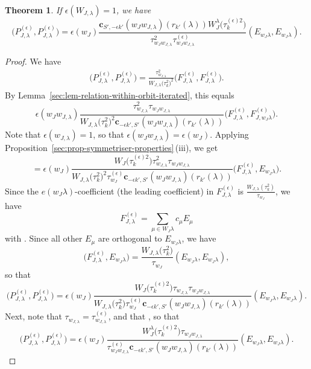 \documentclass[pdftex]{sigma}
\newtheorem{Theorem}{Theorem}[section]
\theoremstyle{definition}
\numberwithin{equation}{section}
\begin{document}
\begin{Theorem}
 If $\epsilon(W_{J,\lambda})=1$, we have
 \[
 \bigl(P^{(\epsilon)}_{J,\lambda}, P^{(\epsilon)}_{J,\lambda}\bigr)
 = \epsilon(w_J) \frac{\bm{c}_{S', -\epsilon k'}(w_Jw_{J,\lambda})(r_{k'}(\lambda)) W_J^\lambda\bigl(\tau^{(\epsilon)2}_k\bigr)}{\tau_{w_Jw_{J,\lambda}}^2\tau^{(\epsilon)}_{w_Jw_{J,\lambda}}}
 (E_{w_J\lambda}, E_{w_J\lambda}).
 \]
\end{Theorem}
\begin{proof}
 We have
 \begin{align*}
 \bigl(P^{(\epsilon)}_{J,\lambda}, P^{(\epsilon)}_{J,\lambda}\bigr)
 = \frac{\tau_{w_{J,\lambda}}^2}{W_{J,\lambda}\bigl(\tau_k^2\bigr)^2}
 \bigl(F^{(\epsilon)}_{J,\lambda}, F^{(\epsilon)}_{J,\lambda}\bigr).
 \end{align*}
 By Lemma~\ref{sec:lem-relation-within-orbit-iterated}, this equals
 \[
 \epsilon(w_Jw_{J,\lambda}) \frac{\tau_{w_{J,\lambda}}^2 \tau_{w_Jw_{J,\lambda}}}{W_{J,\lambda}\bigl(\tau_k^2\bigr)^2\bm{c}_{-\epsilon k',S'}(w_Jw_{J,\lambda})(r_{k'}(\lambda))}
 \bigl(F^{(\epsilon)}_{J,\lambda}, F^{(\epsilon)}_{J,w_J\lambda}\bigr).
 \]
 Note that $\epsilon(w_{J,\lambda})=1$, so that $\epsilon(w_Jw_{J,\lambda})=\epsilon(w_J)$.
 Applying Proposition~\ref{sec:prop-symmetriser-properties}\,(iii), we get
 \[
 = \epsilon(w_J)
\frac{W_J\bigl(\tau^{(\epsilon)2}_k\bigr)\tau_{w_{J,\lambda}}^2 \tau_{w_Jw_{J,\lambda}}}{W_{J,\lambda}\bigl(\tau_k^2\bigr)^2\tau^{(\epsilon)}_{w_J}\bm{c}_{-\epsilon k',S'}(w_Jw_{J,\lambda})(r_{k'}(\lambda))}
 \bigl(F^{(\epsilon)}_{J,\lambda}, E_{w_J\lambda}\bigr).
 \]
 Since the $e(w_J\lambda)$-coefficient (the leading coefficient)
 in $F^{(\epsilon)}_{J,\lambda}$ is $\frac{W_{J,\lambda}(\tau_k^2)}{\tau_{w_J}}$,
 we have
 \[
 F^{(\epsilon)}_{J,\lambda} = \sum_{\mu\in W_J\lambda} c_\mu E_\mu
 \]
 with . Since all
 other $E_\mu$ are orthogonal to $E_{w_J\lambda}$, we have
 \[
 \bigl(F^{(\epsilon)}_{J,\lambda}, E_{w_J\lambda}\bigr)
 = \frac{W_{J,\lambda}\bigl(\tau_k^2\bigr)}{\tau_{w_J}} (E_{w_J\lambda}, E_{w_J\lambda}),
 \]
 so that
 \[
 \bigl(P^{(\epsilon)}_{J,\lambda}, P^{(\epsilon)}_{J,\lambda}\bigr)
 = \epsilon(w_J) \frac{W_J\bigl(\tau^{(\epsilon)2}_k\bigr)\tau_{w_{J,\lambda}} \tau_{w_Jw_{J,\lambda}}}{W_{J,\lambda}\bigl(\tau_k^2\bigr)\tau^{(\epsilon)}_{w_J}\bm{c}_{-\epsilon k',S'}(w_Jw_{J,\lambda})(r_{k'}(\lambda))}
 (E_{w_J\lambda}, E_{w_J\lambda}).
 \]
 Next, note that $\tau_{w_{J,\lambda}}=\tau^{(\epsilon)}_{w_{J,\lambda}}$,
 and that ,
 so that
 \[
 \bigl(P^{(\epsilon)}_{J,\lambda}, P^{(\epsilon)}_{J,\lambda}\bigr)
 = \epsilon(w_J) \frac{W_J^\lambda\bigl(\tau^{(\epsilon)2}_k\bigr)\tau_{w_J w_{J,\lambda}}}{\tau^{(\epsilon)}_{w_Jw_{J,\lambda}}
 \bm{c}_{-\epsilon k', S'}(w_Jw_{J,\lambda})(r_{k'}(\lambda))}
 (E_{w_J\lambda}, E_{w_J\lambda}).\tag*{\qed}
 \] \renewcommand{\qed}{}
\end{proof}
\end{document}
